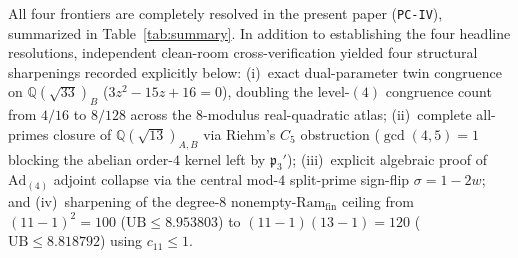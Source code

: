 \documentclass[11pt]{amsart}
\numberwithin{equation}{section}
\theoremstyle{plain}
\theoremstyle{definition}\newtheorem{definition}[theorem]{Definition}
\theoremstyle{remark}\newtheorem{remark}[theorem]{Remark}
\newcommand{\Q}{\mathbb{Q}}
\newcommand{\frp}{\mathfrak{p}}
\newcommand{\Ad}{\mathrm{Ad}}
\newcommand{\Ram}{\mathrm{Ram}}
\begin{document}
All four frontiers are completely resolved in the present paper (\texttt{PC-IV}), summarized in Table~\ref{tab:summary}. In addition to establishing the four headline resolutions, independent clean-room cross-verification yielded four structural sharpenings recorded explicitly below: (i)~exact dual-parameter twin congruence on $\Q(\sqrt{33})_B$ ($3z^2-15z+16=0$), doubling the level-$(4)$ congruence count from $4/16$ to $8/128$ across the $8$-modulus real-quadratic atlas; (ii)~complete all-primes closure of $\Q(\sqrt{13})_{A,B}$ via Riehm's $C_5$ obstruction ($\gcd(4,5)=1$ blocking the abelian order-$4$ kernel left by $\frp_3'$); (iii)~explicit algebraic proof of $\Ad_{(4)}$ adjoint collapse via the central mod-$4$ split-prime sign-flip $\sigma = 1 - 2w$; and (iv)~sharpening of the degree-$8$ nonempty-$\Ram_{\mathrm{fin}}$ ceiling from $(11-1)^2=100$ ($\mathrm{UB} \le 8.953803$) to $(11-1)(13-1)=120$ ($\mathrm{UB} \le 8.818792$) using $c_{11}\le 1$.
\end{document}
